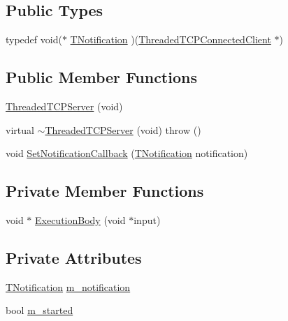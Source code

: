 \subsection*{Public Types}
\begin{DoxyCompactItemize}
\item 
typedef void($\ast$ \hyperlink{class_threaded_t_c_p_server_a01f9e29f617f3452bbf1cdc33acdf905}{T\-Notification} )(\hyperlink{class_threaded_t_c_p_connected_client}{Threaded\-T\-C\-P\-Connected\-Client} $\ast$)
\end{DoxyCompactItemize}
\subsection*{Public Member Functions}
\begin{DoxyCompactItemize}
\item 
\hyperlink{class_threaded_t_c_p_server_a824edd681a2fd81d259efd22de63058d}{Threaded\-T\-C\-P\-Server} (void)
\item 
virtual \hyperlink{class_threaded_t_c_p_server_a151262ca95d024a3da46d8906bfcacfc}{$\sim$\-Threaded\-T\-C\-P\-Server} (void)  throw ()
\item 
void \hyperlink{class_threaded_t_c_p_server_ac201656ab22b4ad07115d78cf8b7dd89}{Set\-Notification\-Callback} (\hyperlink{class_threaded_t_c_p_server_a01f9e29f617f3452bbf1cdc33acdf905}{T\-Notification} notification)
\end{DoxyCompactItemize}
\subsection*{Private Member Functions}
\begin{DoxyCompactItemize}
\item 
void $\ast$ \hyperlink{class_threaded_t_c_p_server_a1e706ece4845443580b2e9c98f178083}{Execution\-Body} (void $\ast$input)
\end{DoxyCompactItemize}
\subsection*{Private Attributes}
\begin{DoxyCompactItemize}
\item 
\hyperlink{class_threaded_t_c_p_server_a01f9e29f617f3452bbf1cdc33acdf905}{T\-Notification} \hyperlink{class_threaded_t_c_p_server_acb1fa272e38dbd62673d5279a3e94345}{m\-\_\-notification}
\item 
bool \hyperlink{class_threaded_t_c_p_server_aae68c31d87e830f67907edba35eceec3}{m\-\_\-started}
\end{DoxyCompactItemize}

